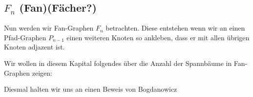 \graphicspath{{grafiken/}}

\subsection{$F_n$ (Fan)(Fächer?)}
Nun werden wir Fan-Graphen $F_n$ betrachten. Diese entstehen wenn wir an einen Pfad-Graphen $P_{n-1}$ einen weiteren Knoten so ankleben, dass er mit allen übrigen Knoten adjazent ist. 

Wir wollen in diesem Kapital folgendes über die Anzahl der Spannbäume in Fan-Graphen zeigen:
\begin{equation}
\end{equation}

Diesmal halten wir uns an einen Beweis von Bogdanowicz ~\cite{bogdanowicz_2008}
